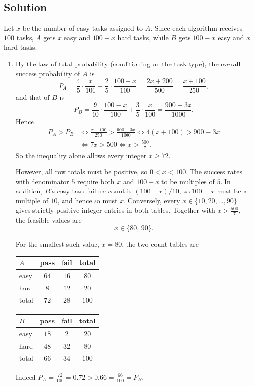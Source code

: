 \documentclass[11pt,a4paper]{article}
\newcommand{\Prob}{P}
\begin{document}
\subsection*{Solution}

Let $x$ be the number of easy tasks assigned to $A$. Since each algorithm
receives $100$ tasks, $A$ gets $x$ easy and $100-x$ hard tasks, while $B$
gets $100-x$ easy and $x$ hard tasks.

\begin{enumerate}
\item By the law of total probability (conditioning on the task type), the
overall success probability of $A$ is
\[
\Prob_A=\frac45\cdot\frac{x}{100}+\frac25\cdot\frac{100-x}{100}
=\frac{2x+200}{500}=\frac{x+100}{250},
\]
and that of $B$ is
\[
\Prob_B=\frac{9}{10}\cdot\frac{100-x}{100}+\frac35\cdot\frac{x}{100}
=\frac{900-3x}{1000}.
\]
Hence
\[
\begin{aligned}
\Prob_A>\Prob_B
&\iff \frac{x+100}{250}>\frac{900-3x}{1000}
\iff 4(x+100)>900-3x\\
&\iff 7x>500
\iff x>\frac{500}{7}.
\end{aligned}
\]
So the inequality alone allows every integer $x\ge72$.

However, all row totals must be positive, so $0<x<100$. The success rates
with denominator $5$ require both $x$ and $100-x$ to be multiples of $5$.
In addition, $B$'s easy-task failure count is $(100-x)/10$, so $100-x$
must be a multiple of $10$, and hence so must $x$. Conversely, every
$x\in\{10,20,\ldots,90\}$ gives strictly positive integer entries in both
tables. Together with $x>\frac{500}{7}$, the feasible values are
\[
x\in\{80,\,90\}.
\]

\begin{samepage}
For the smallest such value, $x=80$, the two count tables are
\begin{center}
\begin{tabular}{lccc}
\toprule
$A$ & pass & fail & total\\\midrule
easy & $64$ & $16$ & $80$\\
hard & $8$ & $12$ & $20$\\\midrule
total & $72$ & $28$ & $100$\\\bottomrule
\end{tabular}
\qquad
\begin{tabular}{lccc}
\toprule
$B$ & pass & fail & total\\\midrule
easy & $18$ & $2$ & $20$\\
hard & $48$ & $32$ & $80$\\\midrule
total & $66$ & $34$ & $100$\\\bottomrule
\end{tabular}
\end{center}
Indeed $\Prob_A=\frac{72}{100}=0.72>0.66=\frac{66}{100}=\Prob_B$.
\end{samepage}


\end{enumerate}
\end{document}
